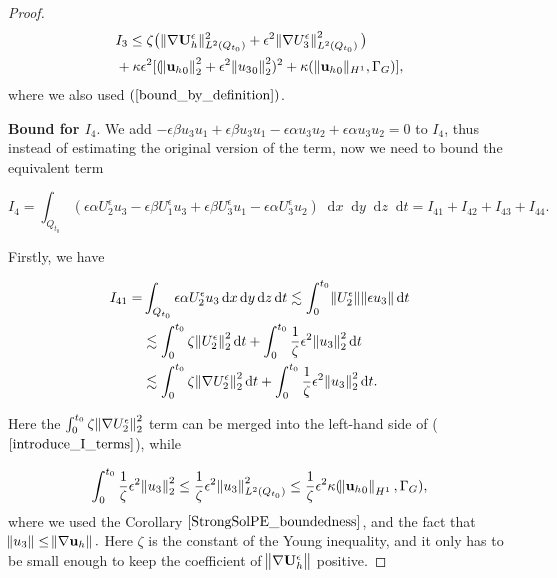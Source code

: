 \documentclass[11pt, a4paper]{article}
\newcommand*\diff{\mathop{}\!\mathrm{d}}
\begin{document}
\begin{proof}
\begin{equation} \label{I3Bound}
\begin{split}
& I_3 \leq \zeta \big ( \| \nabla \mathbf{U}_h^\epsilon \| _{L^2(Q_{t_0})}^2 + \epsilon^2 \norm{\nabla U_3^\epsilon}_{L^2(Q_{t_0})}^2 \big )\\
& + \kappa \epsilon^2 [(\norm{{\mathbf{u}_h}_0}_2^2 + \epsilon^2 \norm{{u_3}_0}_2^2)^2 + \kappa( \| {\mathbf{u}_h}_0 \| _{H^1}, \Gamma_G)],
\end{split}
\end{equation}
%
where we also used $(\ref{bound_by_definition})$.

\textbf{Bound for $I_4.$} We add $ - \epsilon \beta u_3 u_1 + \epsilon \beta u_3 u_1 - \epsilon \alpha u_3 u_2 + \epsilon \alpha u_3 u_2 = 0 $ to $I_4$, thus instead of estimating the original version of the term, now we need to bound the equivalent term

$$ I_4 = \int_{Q_{t_0}} ( \epsilon \alpha U_2^\epsilon u_3 - \epsilon \beta U_1^\epsilon u_3 + \epsilon \beta U_3^\epsilon u_1 - \epsilon \alpha U_3^\epsilon u_2 ) \diff x \diff y \diff z \diff t = I_{41} + I_{42} + I_{43} + I_{44}.$$


\item Firstly, we have

\begin{equation}
\begin{split}
I_{41} = & \int_{Q_{t_0}} \epsilon \alpha U_2^\epsilon u_3 \diff x \diff y \diff z \diff t \lesssim \int_0^{t_0} \norm{U_2^\epsilon} \norm{\epsilon u_3} \diff t \\
& \lesssim \int_0^{t_0} \zeta \norm{U_2^\epsilon}^2_2 \diff t + \int_0^{t_0} \frac{1}{\zeta} \epsilon^2 \norm{u_3}^2_2 \diff t \\
& \lesssim \int_0^{t_0} \zeta \norm{\nabla U_2^\epsilon}^2_2 \diff t + \int_0^{t_0} \frac{1}{\zeta} \epsilon^2 \norm{u_3}^2_2 \diff t.
\end{split}
\end{equation}

Here the $\int_0^{t_0} \zeta \norm{\nabla U_2^\epsilon}^2_2$ term can be merged into the left-hand side of ($\ref{introduce_I_terms}$), while

$$\int_0^{t_0} \frac{1}{\zeta} \epsilon^2 \norm{u_3}^2_2 \leq \frac{1}{\zeta} \epsilon^2 \norm{u_3}^2_{L^2(Q_{t_0})} \leq \frac{1}{\zeta} \epsilon^2 \kappa (\norm{{\mathbf{u}_h}_0}_{H^1}, \Gamma_G),$$
where we used the Corollary $\ref{StrongSolPE_boundedness}$, and the fact that $\norm{u_3} \leq \norm{\nabla \mathbf{u}_h}.$
Here $\zeta$ is the constant of the Young inequality, and it only has to be small enough to keep the coefficient of $\norm{\nabla \mathbf{U}_h^\epsilon}$ positive.


\end{proof}
\end{document}
